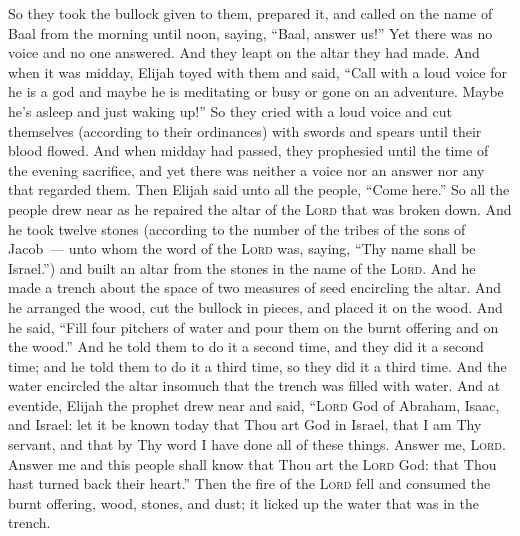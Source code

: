 \begin{inparaenum}
   So they took the bullock given to them, prepared it, and called on the name of Baal from the morning until noon, saying, ``Baal, answer us!'' Yet there was no voice and no one answered. And they leapt on the altar they had made.%
   And when it was midday, Elijah toyed with them and said, ``Call with a loud voice for he is a god and maybe he is meditating or busy or gone on an adventure. Maybe he's asleep and just waking up!''%
   So they cried with a loud voice and cut themselves (according to their ordinances) with swords and spears until their blood flowed.%
   And when midday had passed, they prophesied until the time of the evening sacrifice, and yet there was neither a voice nor an answer nor any that regarded them.%
   Then Elijah said unto all the people, ``Come here.'' So all the people drew near as he repaired the altar of the \textsc{Lord} that was broken down.%
   And he took twelve stones (according to the number of the tribes of the sons of Jacob~--- unto whom the word of the \textsc{Lord} was, saying, ``Thy name shall be Israel.'')%
   and built an altar from the stones in the name of the \textsc{Lord}. And he made a trench about the space of two measures of seed encircling the altar.%
   And he arranged the wood, cut the bullock in pieces, and placed it on the wood.%
    And he said, ``Fill four pitchers of water and pour them on the burnt offering and on the wood.'' And he told them to do it a second time, and they did it a second time; and he told them to do it a third time, so they did it a third time.%
    And the water encircled the altar insomuch that the trench was filled with water.%
   And at eventide, Elijah the prophet drew near and said, ``\textsc{Lord} God of Abraham, Isaac, and Israel: let it be known today that Thou art God in Israel, that I am Thy servant, and that by Thy word I have done all of these things.%
   Answer me, \textsc{Lord}. Answer me and this people shall know that Thou art the \textsc{Lord} God: that Thou hast turned back their heart.''%
   Then the fire of the \textsc{Lord} fell and consumed the burnt offering, wood, stones, and dust; it licked up the water that was in the trench.%

\end{inparaenum}
